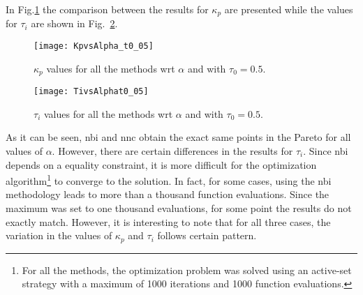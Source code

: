 In Fig.\ref{fig:KpvsAlpha_t0_05.pdf} the comparison between the results for $\kappa_p$ are presented while the values for $\tau_i$ are shown in Fig.~\ref{fig:TivsAlphat0_05}. 
%
\begin{figure}[tb]
\centering
\texttt{[image: KpvsAlpha\_t0\_05]}
\caption{$\kappa_p$ values for all the methods wrt $\alpha$ and with $\tau_0=0.5$.}
\label{fig:KpvsAlpha_t0_05.pdf}
\end{figure}
\begin{figure}[tb]
\centering
\texttt{[image: TivsAlphat0\_05]}
\caption{$\tau_i$ values for all the methods wrt $\alpha$ and with $\tau_0=0.5$.}
\label{fig:TivsAlphat0_05}
\end{figure}
%
As it can be seen, \gls{nbi} and \gls{nnc} obtain the exact same points in the Pareto for all values of $\alpha$. However, there are certain differences in the results for $\tau_i$. Since \gls{nbi} depends on a equality constraint, it is more difficult for the optimization algorithm\footnote{For all the methods, the optimization problem was solved using an active-set strategy with a maximum of 1000 iterations and 1000 function evaluations.} to converge to the solution. In fact, for some cases, using the \gls{nbi} methodology leads to more than a thousand function evaluations. Since the maximum was set to one thousand evaluations, for some point the results do not exactly match. However, it is interesting to note that for all three cases, the variation in the values of $\kappa_p$ and $\tau_i$ follows certain pattern. 

